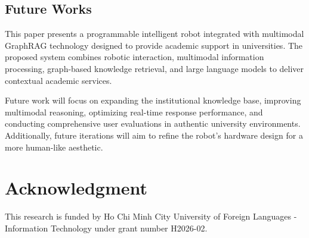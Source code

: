 \documentclass[conference]{IEEEtran}
\begin{document}
\subsection{Future Works}\label{sec7}

This paper presents a programmable intelligent robot integrated with multimodal GraphRAG technology designed to provide academic support in universities. The proposed system combines robotic interaction, multimodal information processing, graph-based knowledge retrieval, and large language models to deliver contextual academic services.

Future work will focus on expanding the institutional knowledge base, improving multimodal reasoning, optimizing real-time response performance, and conducting comprehensive user evaluations in authentic university environments. Additionally, future iterations will aim to refine the robot's hardware design for a more human-like aesthetic.

\section*{Acknowledgment}

This research is funded by Ho Chi Minh City University of Foreign Languages - Information Technology under grant number H2026-02.



\end{document}
